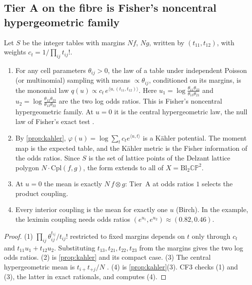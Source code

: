 \documentclass[11pt]{article}
\theoremstyle{definition}\newtheorem{definition}[theorem]{Definition}\newtheorem{remark}[theorem]{Remark}\newtheorem{example}[theorem]{Example}\newtheorem{problem}[theorem]{Open problem}\crefname{problem}{Problem}{Problems}
\begin{document}
\subsection{Tier A on the fibre is Fisher's noncentral hypergeometric family}
\begin{proposition}\label{prop:hypergeom}
Let $S$ be the integer tables with margins $Nf$, $Ng$, written by $(t_{11},t_{12})$, with weights $c_t=1/\prod_{ij}t_{ij}!$.
\begin{enumerate}
\item[(1)] For any cell parameters $\theta_{ij}>0$, the law of a table under independent Poisson (or multinomial) sampling with means $\propto\theta_{ij}$, conditioned on its margins,
  is the monomial law $q(u)\propto c_t\,e^{\langle u,(t_{11},t_{12})\rangle}$. Here $u_1=\log\frac{\theta_{11}\theta_{23}}{\theta_{13}\theta_{21}}$ and $u_2=\log\frac{\theta_{12}\theta_{23}}{\theta_{13}\theta_{22}}$ are the two log odds ratios. This is Fisher's noncentral
  hypergeometric family. At $u=0$ it is the central hypergeometric law, the null law of Fisher's exact test \cite{Fisher1935}.
\item[(2)] By \cref{prop:kahler}, $\varphi(u)=\log\sum_tc_te^{\langle u,t\rangle}$ is a K\"ahler potential. The moment map is the expected table, and the K\"ahler metric is the Fisher information of the odds ratios. Since $S$ is
  the set of lattice points of the Delzant lattice polygon $N\cdot\mathrm{Cpl}(f,g)$, the form extends to all of $X=\mathrm{Bl}_2\mathbb{CP}^2$.
\item[(3)] At $u=0$ the mean is exactly $N\,f\otimes g$: Tier~A at odds ratios $1$ selects the product coupling.
\item[(4)] Every interior coupling is the mean for exactly one $u$ (Birch). In the example, the leximin coupling needs odds ratios $(e^{u_1},e^{u_2})\approx(0.82,0.46)$.
\end{enumerate}
\end{proposition}

\begin{proof}
(1) $\prod_{ij}\theta_{ij}^{t_{ij}}/t_{ij}!$ restricted to fixed margins depends on $t$ only through $c_t$ and $t_{11}u_1+t_{12}u_2$. Substituting $t_{13},t_{21},t_{22},t_{23}$ from the margins
gives the two log odds ratios. (2) is \cref{prop:kahler} and its compact case. (3) The central hypergeometric mean is $t_{i+}t_{+j}/N$ \cite{BishopFienbergHolland1975}. (4) is
\cref{prop:kahler}(3). CF3 checks (1) and (3), the latter in exact rationals, and computes (4).
\end{proof}
\end{document}
